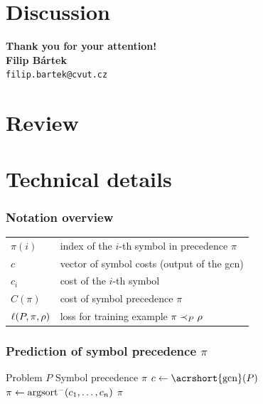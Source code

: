 \documentclass[a4paper]{beamer}
\makeatletter
\newcommand\Email{filip.bartek@cvut.cz}
\makeatother
\begin{document}
\section*{Discussion}
\begin{frame}
\begin{center}
\vspace*{1cm}
{\bf Thank you for your attention!}\\
\vspace*{2cm}
{\bf\Large Filip Bártek}\\
{\tt \Email}
\vspace*{1cm}
\end{center}

\end{frame}
%
\appendix

\section{Review}


\section{Technical details}

\begin{frame}
\frametitle{Notation overview}
\begin{center}
\begin{tabular}{ll}
$\pi(i)$ & index of the $i$-th symbol in precedence $\pi$ \\
$c$ & vector of symbol costs (output of the \acrshort{gcn}) \\
$c_i$ & cost of the $i$-th symbol \\
$C(\pi)$ & cost of symbol precedence $\pi$ \\
$\ell(P, \pi, \rho)$ & loss for training example $\pi \prec_{P} \rho$ \\
\end{tabular}
\end{center}
\end{frame}

\begin{frame}
\frametitle{Prediction of symbol precedence $\pi$}
\begin{algorithmic} %
\REQUIRE Problem $P$
\ENSURE Symbol precedence $\pi$
\STATE $c \gets \mathrm{\acrshort{gcn}}(P)$
\STATE $\pi \gets \operatorname{argsort}^- (c_1, \ldots, c_n)$
\RETURN $\pi$
\end{algorithmic}
\end{frame}
\end{document}
